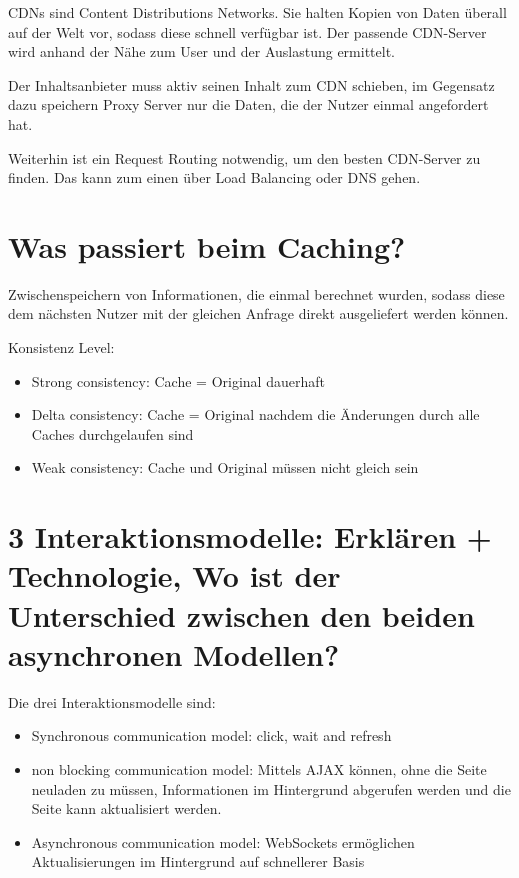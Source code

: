 \documentclass{article}
\begin{document}
	CDNs sind Content Distributions Networks. Sie halten Kopien von Daten überall auf der Welt vor, sodass diese schnell verfügbar ist. Der passende CDN-Server wird anhand der Nähe zum User und der Auslastung ermittelt.
	
	Der Inhaltsanbieter muss aktiv seinen Inhalt zum CDN schieben, im Gegensatz dazu speichern Proxy Server nur die Daten, die der Nutzer einmal angefordert hat.
	
	Weiterhin ist ein Request Routing notwendig, um den besten CDN-Server zu finden. Das kann zum einen über Load Balancing oder DNS gehen.
	
	\section*{Was passiert beim Caching?}
	
	Zwischenspeichern von Informationen, die einmal berechnet wurden, sodass diese dem nächsten Nutzer mit der gleichen Anfrage direkt ausgeliefert werden können.
	
	Konsistenz Level:
	\begin{itemize}
		\item Strong consistency: Cache = Original dauerhaft
		\item Delta consistency: Cache = Original nachdem die Änderungen durch alle Caches durchgelaufen sind
		\item Weak consistency: Cache und Original müssen nicht gleich sein
	\end{itemize}
	
	\section*{3 Interaktionsmodelle: Erklären + Technologie, Wo ist der Unterschied zwischen den beiden asynchronen Modellen?}
	
	Die drei Interaktionsmodelle sind:
	\begin{itemize}
		\item Synchronous communication model: click, wait and refresh
		\item non blocking communication model: Mittels AJAX können, ohne die Seite neuladen zu müssen, Informationen im Hintergrund abgerufen werden und die Seite kann aktualisiert werden.
		\item Asynchronous communication model: WebSockets ermöglichen Aktualisierungen im Hintergrund auf schnellerer Basis
	\end{itemize}
\end{document}
